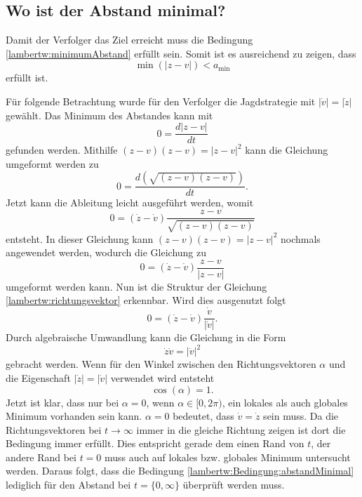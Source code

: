 \subsection{Wo ist der Abstand minimal?}
Damit der Verfolger das Ziel erreicht muss die Bedingung \eqref{lambertw:minimumAbstand} erfüllt sein.
Somit ist es ausreichend zu zeigen, dass
\begin{equation}
    \operatorname{min}(|z-v|)<a_\text{min}
    \label{lambertw:Bedingung:abstandMinimal}
\end{equation}
erfüllt ist.

Für folgende Betrachtung wurde für den Verfolger die Jagdstrategie mit $|\dot{v}|=|\dot{z}|$ gewählt.
Das Minimum des Abstandes kann mit
\begin{equation}
    0=\frac{d|z-v|}{dt}
\end{equation}
gefunden werden.
Mithilfe $(z-v)(z-v)=|z-v|^2$ kann die Gleichung umgeformt werden zu
\begin{equation}
    0=\frac{d(\sqrt{(z-v)(z-v)})}{dt}
    \text{.}
\end{equation}
Jetzt kann die Ableitung leicht ausgeführt werden, womit
\begin{equation}
    0=(\dot{z}-\dot{v})\frac{z-v}{\sqrt{(z-v)(z-v)}}
\end{equation}
entsteht.
In dieser Gleichung kann $(z-v)(z-v)=|z-v|^2$ nochmals angewendet werden, wodurch die Gleichung zu
\begin{equation}
    0=(\dot{z}-\dot{v})\frac{z-v}{|z-v|}
\end{equation}
umgeformt werden kann.
Nun ist die Struktur der Gleichung \eqref{lambertw:richtungsvektor} erkennbar.
Wird dies ausgenutzt folgt
\begin{equation}
    0=(\dot{z}-\dot{v})\frac{\dot{v}}{|\dot{v}|}
    \text{.}
\end{equation}
Durch algebraische Umwandlung kann die Gleichung in die Form
\begin{equation}
    \dot{z}\dot{v}=|\dot{v}|^2
\end{equation}
gebracht werden.
Wenn für den Winkel zwischen den Richtungsvektoren $\alpha$ und die Eigenschaft $|\dot{z}|=|\dot{v}|$ verwendet wird entsteht
\begin{equation}
    \cos(\alpha)=1
    \text{.}
\end{equation}
Jetzt ist klar, dass nur bei $\alpha=0$, wenn $\alpha \in [0,2\pi)$, ein lokales als auch globales Minimum vorhanden sein kann.
$\alpha=0$ bedeutet, dass $\dot{v}=\dot{z}$ sein muss.
Da die Richtungsvektoren bei $t\rightarrow\infty$ immer in die gleiche Richtung zeigen ist dort die Bedingung immer erfüllt.
Dies entspricht gerade dem einen Rand von $t$, der andere Rand bei $t=0$ muss auch auf lokales bzw. globales Minimum untersucht werden.
Daraus folgt, dass die Bedingung \eqref{lambertw:Bedingung:abstandMinimal} lediglich für den Abstand bei $t=\{0, \infty\}$ überprüft werden muss.